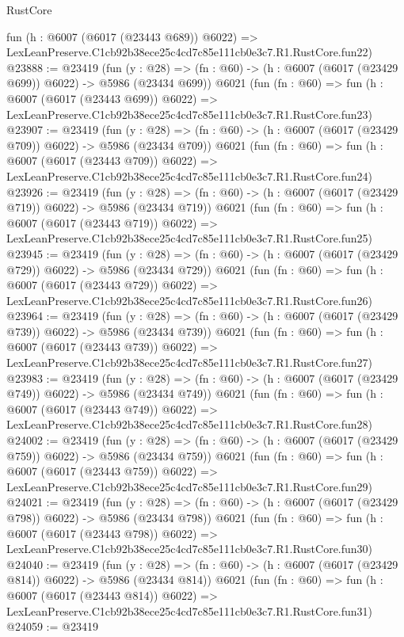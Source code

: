 \begin{lexlean}{RustCore}
\begin{coremodule}
    fun (h : @6007 (@6017 (@23443 @689)) @6022) =>
    LexLeanPreserve.C1cb92b38ece25c4cd7c85e111cb0e3c7.R1.RustCore.fun22)
@23888 := @23419
    (fun (y : @28) => (fn : @60) -> (h : @6007 (@6017 (@23429 @699)) @6022) -> @5986 (@23434 @699))
    @6021
    (fun (fn : @60) =>
    fun (h : @6007 (@6017 (@23443 @699)) @6022) =>
    LexLeanPreserve.C1cb92b38ece25c4cd7c85e111cb0e3c7.R1.RustCore.fun23)
@23907 := @23419
    (fun (y : @28) => (fn : @60) -> (h : @6007 (@6017 (@23429 @709)) @6022) -> @5986 (@23434 @709))
    @6021
    (fun (fn : @60) =>
    fun (h : @6007 (@6017 (@23443 @709)) @6022) =>
    LexLeanPreserve.C1cb92b38ece25c4cd7c85e111cb0e3c7.R1.RustCore.fun24)
@23926 := @23419
    (fun (y : @28) => (fn : @60) -> (h : @6007 (@6017 (@23429 @719)) @6022) -> @5986 (@23434 @719))
    @6021
    (fun (fn : @60) =>
    fun (h : @6007 (@6017 (@23443 @719)) @6022) =>
    LexLeanPreserve.C1cb92b38ece25c4cd7c85e111cb0e3c7.R1.RustCore.fun25)
@23945 := @23419
    (fun (y : @28) => (fn : @60) -> (h : @6007 (@6017 (@23429 @729)) @6022) -> @5986 (@23434 @729))
    @6021
    (fun (fn : @60) =>
    fun (h : @6007 (@6017 (@23443 @729)) @6022) =>
    LexLeanPreserve.C1cb92b38ece25c4cd7c85e111cb0e3c7.R1.RustCore.fun26)
@23964 := @23419
    (fun (y : @28) => (fn : @60) -> (h : @6007 (@6017 (@23429 @739)) @6022) -> @5986 (@23434 @739))
    @6021
    (fun (fn : @60) =>
    fun (h : @6007 (@6017 (@23443 @739)) @6022) =>
    LexLeanPreserve.C1cb92b38ece25c4cd7c85e111cb0e3c7.R1.RustCore.fun27)
@23983 := @23419
    (fun (y : @28) => (fn : @60) -> (h : @6007 (@6017 (@23429 @749)) @6022) -> @5986 (@23434 @749))
    @6021
    (fun (fn : @60) =>
    fun (h : @6007 (@6017 (@23443 @749)) @6022) =>
    LexLeanPreserve.C1cb92b38ece25c4cd7c85e111cb0e3c7.R1.RustCore.fun28)
@24002 := @23419
    (fun (y : @28) => (fn : @60) -> (h : @6007 (@6017 (@23429 @759)) @6022) -> @5986 (@23434 @759))
    @6021
    (fun (fn : @60) =>
    fun (h : @6007 (@6017 (@23443 @759)) @6022) =>
    LexLeanPreserve.C1cb92b38ece25c4cd7c85e111cb0e3c7.R1.RustCore.fun29)
@24021 := @23419
    (fun (y : @28) => (fn : @60) -> (h : @6007 (@6017 (@23429 @798)) @6022) -> @5986 (@23434 @798))
    @6021
    (fun (fn : @60) =>
    fun (h : @6007 (@6017 (@23443 @798)) @6022) =>
    LexLeanPreserve.C1cb92b38ece25c4cd7c85e111cb0e3c7.R1.RustCore.fun30)
@24040 := @23419
    (fun (y : @28) => (fn : @60) -> (h : @6007 (@6017 (@23429 @814)) @6022) -> @5986 (@23434 @814))
    @6021
    (fun (fn : @60) =>
    fun (h : @6007 (@6017 (@23443 @814)) @6022) =>
    LexLeanPreserve.C1cb92b38ece25c4cd7c85e111cb0e3c7.R1.RustCore.fun31)
@24059 := @23419

\end{coremodule}
\end{lexlean}
